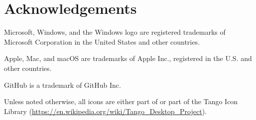 
\chapter*{Acknowledgements}

Microsoft, Windows, and the Windows logo are registered trademarks of Microsoft Corporation in the United States and other countries.

Apple, Mac, and macOS are trademarks of Apple Inc., registered in the U.S. and other countries.

GitHub is a trademark of GitHub Inc.

Unless noted otherwise, all icons are either part of {\Tw} or part of the Tango Icon Library (\url{https://en.wikipedia.org/wiki/Tango_Desktop_Project}).

\nocite{dkn1,dkn2,lla,companion,xetmain,xetshol}



\printindex
